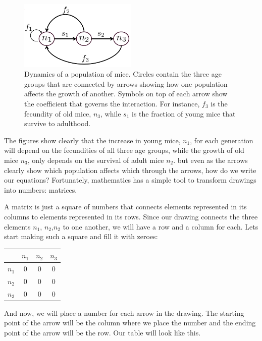 \documentclass[12pt]{article}
\begin{document}
\begin{figure}
	\begin{center}
		\includegraphics[width=0.5\textwidth]{Mouse_pop_graph}
	\end{center}
	\caption{Dynamics of a population of mice. Circles contain the three age groups that are connected by arrows showing how one population affects the growth of another. Symbols on top of each arrow show the coefficient that governs the interaction. For instance, $f_3$ is the fecundity of old mice, $n_3$, while $s_1$ is the fraction of young mice that survive to adulthood.}
	\label{fig:mice}
\end{figure}
 
The figures show clearly that the increase in young mice, $n_1$, for each generation will depend on the fecundities of all three age groups, while the growth of old mice $n_3$, only depends on the survival of adult mice $n_2$. but even as the arrows clearly show which population affects which through the arrows, how do we write our equations? Fortunately, mathematics has a simple tool to transform drawings into numbers: matrices.

A matrix is just a square of numbers that connects elements represented in its columns to elements represented in its rows. Since our drawing connects the three elements $n_1$, $n_2$,$n_2$ to one another, we will have a row and a column for each. Lets start making such a square and fill it with zeroes:

\begin{center}
\begin{tabular}{c|ccc}
	& $n_1$ & $n_2$ & $n_3$ \\
	\hline 
	$n_1$ &0	&0	&0	\\
	$n_2$ &0	&0	&0	\\
	$n_3$ &0	&0	&0	\\
\end{tabular}
\end{center}

And now, we will place a number for each arrow in the drawing. The starting point of the arrow will be the column where we place the number and the ending point of the arrow will be the row. Our table will look like this.
\end{document}
